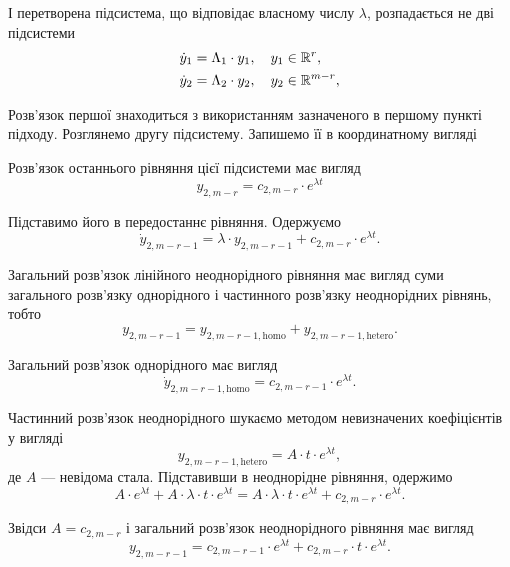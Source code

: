\begin{enumerate}
І перетворена підсистема, що відповідає власному числу $\lambda$, розпадається не дві підсистеми
\begin{align*}
	\dot y_1 &= \Lambda_1 \cdot y_1, \quad y_1 \in \mathbb{R}^r, \\
	\dot y_2 &= \Lambda_2 \cdot y_2, \quad y_2 \in \mathbb{R}^{m - r},
\end{align*}

Розв’язок першої знаходиться з використанням зазначеного в першому пункті підходу. Розглянемо другу підсистему. Запишемо її в координатному вигляді
 
Розв’язок останнього рівняння цієї підсистеми має вигляд
\begin{equation*}
	y_{2, m - r} = c_{2, m - r} \cdot e^{\lambda t}
\end{equation*}

Підставимо його в передостаннє рівняння. Одержуємо
\begin{equation*}
	\dot y_{2, m - r - 1} = \lambda \cdot y_{2, m - r - 1} + c_{2, m - r} \cdot e^{\lambda t}.
\end{equation*}

Загальний розв’язок лінійного неоднорідного рівняння має вигляд суми загального розв’язку однорідного і частинного розв’язку неоднорідних рівнянь, тобто
\begin{equation*}
	y_{2, m - r - 1} = y_{2, m - r - 1, \text{homo}} + y_{2, m - r - 1, \text{hetero}}.
\end{equation*}

Загальний розв’язок однорідного має вигляд
\begin{equation*}
	\dot y_{2, m - r - 1, \text{homo}} = c_{2, m - r - 1} \cdot e^{\lambda t}.
\end{equation*}

Частинний розв’язок неоднорідного шукаємо методом невизначених коефіцієнтів у вигляді
\begin{equation*}
	y_{2, m - r - 1, \text{hetero}} = A \cdot t \cdot e^{\lambda t},
\end{equation*}
де $A$ --- невідома стала. Підставивши в неоднорідне рівняння, одержимо
\begin{equation*}
	A \cdot e^{\lambda t} + A \cdot \lambda \cdot t \cdot e^{\lambda t} = A \cdot \lambda \cdot t \cdot e^{\lambda t} + c_{2, m - r} \cdot e^{\lambda t}.
\end{equation*}

Звідси $A = c_{2, m - r}$ і загальний розв’язок неоднорідного рівняння має вигляд
\begin{equation*}
	y_{2, m - r - 1} = c_{2, m - r - 1} \cdot e^{\lambda t} + c_{2, m - r} \cdot t \cdot e^{\lambda t}.
\end{equation*}


\end{enumerate}
